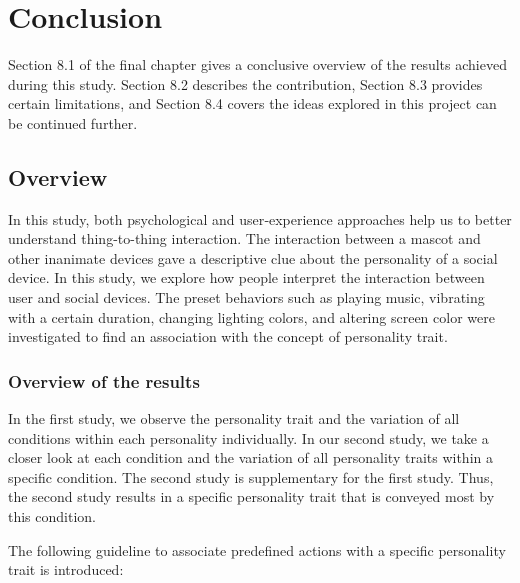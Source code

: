\chapter{Conclusion}
\label{ch:conclusion}
Section 8.1 of the final chapter gives a conclusive overview of the results achieved during this study.
Section 8.2 describes the contribution, Section 8.3 provides certain limitations,
and Section 8.4 covers the ideas explored in this project can be continued further.

\section{Overview}
\label{sec:overview}
In this study, both psychological and user‐experience approaches help us to better understand thing-to-thing interaction.
The interaction between a mascot and other inanimate devices gave a
descriptive clue about the personality of a social device.
In this study, we explore how people interpret the interaction between user and social devices.
The preset behaviors such as playing music, vibrating with a certain duration, changing lighting colors,
and altering screen color were investigated to find an association with the concept of personality trait.

\subsection{Overview of the results}
\label{subsec:overview-of-the-results}
In the first study, we observe the personality trait and the variation of all
conditions within each personality individually.
In our second study, we take a closer look at each condition and the variation of
all personality traits within a specific condition.
The second study is supplementary for the first study.
Thus, the second study results in a specific personality trait that is conveyed most by this condition.

The following guideline to associate predefined actions with a specific personality trait is introduced:

